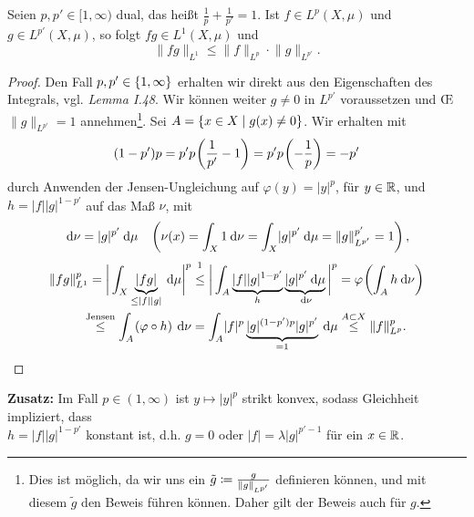 \documentclass[skript.tex]{subfiles}
\begin{document}
	
\setcounter{cntr}{5}

\begin{theorem}[Hölder]
	Seien $p, p' \in [1, \infty)$ \textup{dual}, das heißt $\frac{1}{p} + \frac{1}{p'} = 1$. Ist $f \in L^p (X, \mu)$ und $g \in L^{p'} (X,\mu)$, so folgt $fg \in L^1(X,\mu)$ und 
	\[
		\lVert fg \rVert_{L^1} \leq \lVert f \rVert_{L^p} \cdot \lVert g \rVert_{L^{p'}}.
	\]
\end{theorem}

\begin{proof}
	Den Fall $p,p' \in \left\{1,\infty\right\}$ erhalten wir direkt aus den Eigenschaften des Integrals, vgl. \textit{Lemma I.48}. Wir können weiter $g\neq 0$ in $L^{p'}$ voraussetzen und \OE\ $\lVert g \rVert_{L^{p'}} = 1$ annehmen\footnote{Dies ist möglich, da wir uns ein $\tilde{g} \coloneqq \frac{g}{\lVert g \rVert_{L^{p'} } }$ definieren können, und mit diesem $\tilde{g}$ den Beweis führen können. Daher gilt der Beweis auch für $g$.}. Sei $A = \left\{x\in X \mid g(x) \neq 0\right\}$. Wir erhalten mit 
	\[
		(1-p')p = p'p\pr{\frac{1}{p'} -1} = p'p\pr{-\frac{1}{p}} = -p'
	\]
	durch Anwenden der Jensen-Ungleichung auf $\varphi(y) = \lvert y \rvert^p$, für $y \in \mathbb{R}$, und $h=\lvert f \rvert \lvert g \rvert^{1-p'}$ auf das Maß $\nu$, mit 
	\[
		\md \nu = \lvert g \rvert^{p'} \md \mu \quad \pr{\nu(x) = \int_X 1 \md \nu = \int_X \lvert g \rvert^{p'} \md \mu = \lVert g \rVert_{L^{p'}}^{p'} = 1},
	\]
	\begin{align*}
		\lVert fg \rVert_{L^1}^{p} &= \bigg\lvert \int_X \underbrace{\lvert fg \rvert }_{\leq \lvert f \rvert \lvert g \rvert} \md \mu \bigg\rvert^p \stackrel{\footnotemark}{\leq} \bigg\lvert \int_A \underbrace{\lvert f \rvert \lvert g \rvert^{1-p'}}_{h} \underbrace{\lvert g \rvert^{p'} \md \mu}_{\md \nu} \bigg\rvert^p = \varphi \pr{\int_A h \md \nu}\\
		&\kern -0.5em \stackrel{\text{\scriptsize Jensen}}{\leq} \int_A \pr{\varphi \circ h} \md \nu = \int_A \lvert f \rvert^p \underbrace{\lvert g \rvert^{(1-p')p} \lvert g \rvert^{p'}}_{=1} \md \mu \stackrel{A\sbs X}{\leq} \lVert f \rVert_{L^p}^p.
	\end{align*}
\end{proof}

\textbf{Zusatz:} Im Fall $p \in (1, \infty)$ ist $y \mapsto \lvert y \rvert^p$ strikt konvex, sodass Gleichheit impliziert, dass \\$h = \lvert f \rvert \lvert g \rvert^{1-p'}$ konstant ist, d.h. $g=0$ oder $\lvert f \rvert = \lambda \lvert g \rvert^{p'-1}$ für ein $x \in \mathbb{R}$. %
\end{document}
